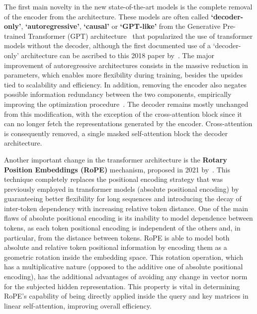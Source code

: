 The first main novelty in the new state-of-the-art models is the complete removal of the encoder from the architecture.
These models are often called \textbf{`decoder-only'}, \textbf{`autoregressive'}, \textbf{`causal'} or \textbf{`GPT-like'} from the Generative Pre-trained Transformer (GPT) architecture~\cite{radford2018,radford2019,brown2020,openai2023} that popularized the use of transformer models without the decoder, although the first documented use of a `decoder-only' architecture can be ascribed to this 2018 paper by~\citet{liu2018}.
The major improvement of autoregressive architectures consists in the massive reduction in parameters, which enables more flexibility during training, besides the upsides tied to scalability and efficiency.
In addition, removing the encoder also negates possible information redundancy between the two components, empirically improving the optimization procedure~\citet{liu2018}.
The decoder remains mostly unchanged from this modification, with the exception of the cross-attention block since it can no longer fetch the representations generated by the encoder.
Cross-attention is consequently removed,  a single masked self-attention block  the decoder architecture.

Another important change in the transformer architecture is the \textbf{Rotary Position Embeddings (RoPE)} mechanism, proposed in 2021 by~\citet{su2024}.
This technique completely replaces the positional encoding strategy that was previously employed in transformer models (absolute positional encoding) by guaranteeing better flexibility for long sequences and introducing the decay of inter-token dependency with increasing relative token distance.
One of the main flaws of absolute positional encoding is its inability to model dependence between tokens, as each token positional encoding is independent of the others and, in particular, from the distance between tokens.
RoPE is able to model both absolute and relative token positional information by encoding them as a geometric rotation inside the embedding space.
This rotation operation, which has a multiplicative nature (opposed to the additive one of absolute positional encoding), has the additional advantages of avoiding any change in vector norm for the subjected hidden representation.
This property is vital in determining RoPE's capability of being directly applied inside the query and key matrices in linear self-attention, improving overall efficiency.


